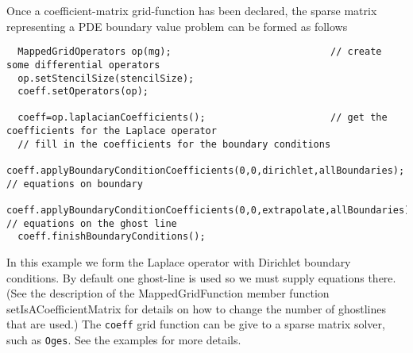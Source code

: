 Once a coefficient-matrix grid-function has been declared, the sparse matrix
representing a PDE boundary value problem can be formed as follows
{\footnotesize
\begin{verbatim}
  MappedGridOperators op(mg);                            // create some differential operators
  op.setStencilSize(stencilSize);
  coeff.setOperators(op);
  
  coeff=op.laplacianCoefficients();                      // get the coefficients for the Laplace operator
  // fill in the coefficients for the boundary conditions
  coeff.applyBoundaryConditionCoefficients(0,0,dirichlet,allBoundaries);     // equations on boundary
  coeff.applyBoundaryConditionCoefficients(0,0,extrapolate,allBoundaries);   // equations on the ghost line
  coeff.finishBoundaryConditions();
\end{verbatim}
}
In this example we form the Laplace operator with Dirichlet boundary conditions.
By default one ghost-line is used so we must supply equations there. (See the description
of the {\ff MappedGridFunction} member function {\ff setIsACoefficientMatrix} for details
on how to change the number of ghostlines that are used.)
The {\tt coeff} grid function can be give to a sparse matrix solver, such as
{\tt Oges}. See the examples for more details.


